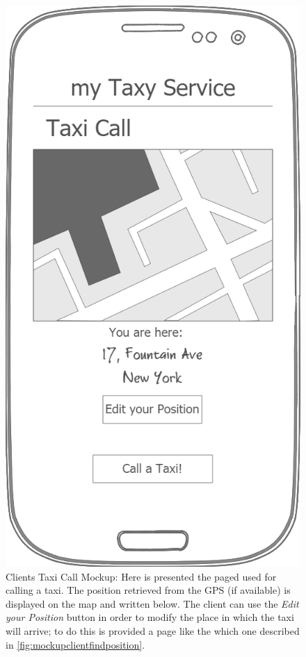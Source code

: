 \documentclass[a4paper]{article}
\begin{document}
\begin{figure}[H]
\includegraphics[width=\mockupWidth]{Mockup-ClientsTaxiCall}
\centering
\caption[Clients Taxi Call Mockup]{Clients Taxi Call Mockup: \newline Here is presented the paged used for calling a taxi. The  position retrieved from the GPS (if available) is displayed on the map and written below. The client can use the \emph{Edit your Position} button in order to modify the place in which the taxi will arrive; to do this is provided a page like the which one described in  \autoref{fig:mockupclientfindposition}.}
\label{fig:mockupclienttaxicall}
\end{figure}
\end{document}

